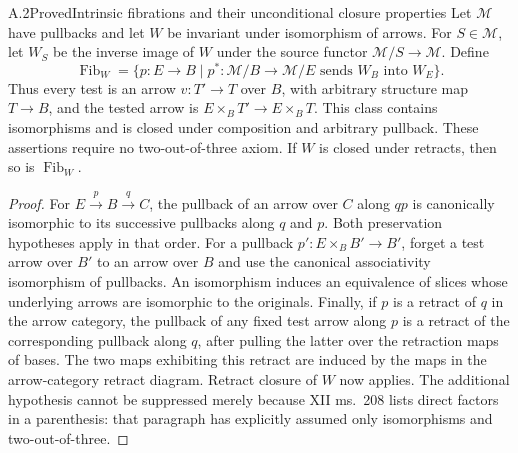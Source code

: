 \begin{claim}{A.2}{Proved}{Intrinsic fibrations and their unconditional closure properties}
Let $\mathcal M$ have pullbacks and let $W$ be invariant under isomorphism of arrows. For $S\in\mathcal M$, let $W_S$ be the inverse image of $W$ under the source functor $\mathcal M/S\to\mathcal M$. Define
\[
\operatorname{Fib}_W=\{p:E\to B\mid p^*: \mathcal M/B\to\mathcal M/E\text{ sends }W_B\text{ into }W_E\}.
\]
Thus every test is an arrow $v:T'\to T$ over $B$, with arbitrary structure map $T\to B$, and the tested arrow is $E\times_B T'\to E\times_B T$. This class contains isomorphisms and is closed under composition and arbitrary pullback. These assertions require no two-out-of-three axiom. If $W$ is closed under retracts, then so is $\operatorname{Fib}_W$.
\end{claim}
\begin{proof}
For $E\xrightarrow p B\xrightarrow q C$, the pullback of an arrow over $C$ along $qp$ is canonically isomorphic to its successive pullbacks along $q$ and $p$. Both preservation hypotheses apply in that order. For a pullback $p':E\times_B B'\to B'$, forget a test arrow over $B'$ to an arrow over $B$ and use the canonical associativity isomorphism of pullbacks. An isomorphism induces an equivalence of slices whose underlying arrows are isomorphic to the originals. Finally, if $p$ is a retract of $q$ in the arrow category, the pullback of any fixed test arrow along $p$ is a retract of the corresponding pullback along $q$, after pulling the latter over the retraction maps of bases. The two maps exhibiting this retract are induced by the maps in the arrow-category retract diagram. Retract closure of $W$ now applies. The additional hypothesis cannot be suppressed merely because XII ms.~208 lists direct factors in a parenthesis: that paragraph has explicitly assumed only isomorphisms and two-out-of-three.
\end{proof}

